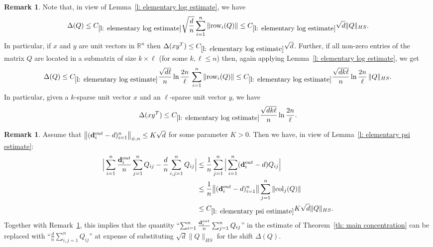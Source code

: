 \documentclass[12pt]{article}
\theoremstyle{definition}
\newtheorem{Remark}[theorem]{Remark}
\theoremstyle{plain}
\newcommand{\R}{\mathbb{R}}
\def\OutDeg{{\bf d}^{out}}
\def\Col{{\rm col}}
\def\Row{{\rm row}}
\begin{document}
\begin{Remark}\label{rem: concentration-shift}
Note that, in view of Lemma~\ref{l: elementary log estimate}, we have
$$\Delta(Q)\leq C_{\ref{l: elementary log estimate}}\sqrt{\frac{d}{n}}\sum_{i=1}^n \|\Row_i(Q)\|
\leq C_{\ref{l: elementary log estimate}}\sqrt{d}\|Q\|_{HS}.$$
In particular, if $x$ and $y$ are unit vectors in $\R^n$ then
$\Delta(x y^T)\leq C_{\ref{l: elementary log estimate}}\sqrt{d}$.
Further, if all non-zero entries of the matrix $Q$ are located in a submatrix of size $k\times \ell$
(for some $k,\ell\leq n$) then, again applying Lemma~\ref{l: elementary log estimate},
we get
$$\Delta(Q)\leq C_{\ref{l: elementary log estimate}}\frac{\sqrt{d\ell}}{n}\ln\frac{2n}{\ell}\,\sum_{i=1}^n\|\Row_i(Q)\|
\leq C_{\ref{l: elementary log estimate}}\frac{\sqrt{d k\ell}}{n}\ln\frac{2n}{\ell}\,\|Q\|_{HS}.$$
In particular, given a $k$-sparse unit vector $x$ and an $\ell$-sparse unit vector $y$, we have
$$\Delta(x y^T)
\leq C_{\ref{l: elementary log estimate}}\frac{\sqrt{d k\ell}}{n}\ln\frac{2n}{\ell}.$$
\end{Remark}

\begin{Remark}\label{rem: d instead of dout}
Assume that $\bigl\|(\OutDeg_i-d)_{i=1}^n\bigr\|_{\psi,n}\leq K\sqrt{d}$ for some parameter $K>0$.
Then we have, in view of Lemma~\ref{l: elementary psi estimate}:
\begin{align*}
\Big|\sum_{i=1}^n\frac{\OutDeg_{i}}{n}\sum_{j=1}^n Q_{ij}-\frac{d}{n}\sum_{i,j=1}^n Q_{ij}\Big|
&\leq \frac{1}{n}\sum_{j=1}^n\Big|\sum_{i=1}^n (\OutDeg_{i}-d)Q_{ij}\Big|\\
&\leq \frac{1}{n}\bigl\|(\OutDeg_i-d)_{i=1}^n\bigr\|\sum_{j=1}^n\|\Col_j(Q)\|\\
&\leq C_{\ref{l: elementary psi estimate}}K\sqrt{d}\|Q\|_{HS}.
\end{align*}
Together with Remark~\ref{rem: concentration-shift}, this implies that the quantity ``$\sum_{i=1}^n\frac{\OutDeg_{i}}{n}\sum_{j=1}^n Q_{ij}$''
in the estimate of Theorem~\ref{th: main concentration} can be replaced with ``$\frac{d}{n}\sum_{i,j=1}^n Q_{ij}$''
at expense of substituting $\sqrt{d}\|Q\|_{HS}$ for the shift $\Delta(Q)$.
\end{Remark}
\end{document}
